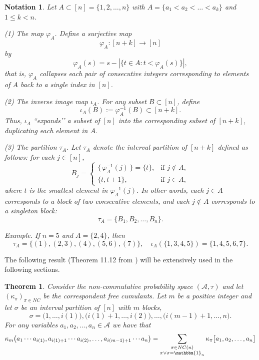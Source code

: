 \documentclass{amsart}
\newtheorem{notation}[claim]{Notation}
\newtheorem{thm}[claim]{Theorem}
\begin{document}
 \begin{notation}
 Let $A \subset [n] = \{1, 2, \dots, n\}$ with
 $A = \{a_1 < a_2 < \dots < a_k\}$ and $1 \le k < n$.
 
 \smallskip
 \noindent
 (1) The map $\varphi_A$.
 Define a surjective map
 \[
 \varphi_A : [n+k] \to [n]
 \]
 by
 \[
 \varphi_A(s) = s - |\{t \in A : t < \varphi_A(s)\}|,
 \]
 that is, $\varphi_A$ collapses each pair of consecutive integers
 corresponding to elements of $A$ back to a single index in $[n]$. 
 
 \smallskip
 \noindent
 (2) The inverse image map $\iota_A$.
 For any subset $B \subset [n]$, define
 \[
 \iota_A(B) := \varphi_A^{-1}(B) \subset [n+k].
 \]
 Thus, $\iota_A$ “expands’’ a subset of $[n]$ into the corresponding subset of $[n+k]$, duplicating each element in $A$.
 
 \smallskip
 \noindent
 (3) The partition $\tau_A$.
 Let $\tau_A$ denote the interval partition of $[n+k]$ defined as follows:
 for each $j \in [n]$,
 \[
 B_j =
 \begin{cases}
 	\{\, \varphi_A^{-1}(j) \,\} = \{t\}, & \text{if } j \notin A,\\[3pt]
 	\{t, t+1\}, & \text{if } j \in A,
 \end{cases}
 \]
 where $t$ is the smallest element in $\varphi_A^{-1}(j)$.
 In other words, each $j \in A$ corresponds to a block of two consecutive elements, and each $j \notin A$ corresponds to a singleton block:
 \[
 \tau_A = \{B_1, B_2, \dots, B_n\}.
 \]
 
 \smallskip
 \noindent
 Example.
 If $n=5$ and $A = \{2, 4\}$, then
 \[
 \tau_A = \{(1), (2,3), (4), (5,6), (7)\},
 \quad
 \iota_A(\{1,3,4,5\}) = \{1,4,5,6,7\}.
 \]
 \end{notation}
 
 
The following result (Theorem 11.12 from \cite{nisp}) will be extensively used in the
following sections.
\begin{thm}\label{thm:product-entries}
Consider the non-commutative probability space $(\mathcal{A}, \tau)$ and let
$(\kappa_\pi)_{\pi \in NC} $ be the correspondent free cumulants. Let $m $ be a positive integer and let $\sigma $ be an interval partition of $[n]$ with $m$ blocks, 
\[ \sigma = \big(1, \dots, i(1)\big), \big(i(1)+1, \dots, i(2)\big), 
\dots, 
\big(i(m-1)+1, \dots, n\big).
\]
For any variables $ a_1, a_2, \dots, a_n \in \mathcal{A}$  we have that
\[ 
\kappa_m \big( a_1\cdots a_{i(1)}, a_{i(1)+1} \cdots a_{i(2)}, \dots, a_{i(m-1)+1} \cdots a_n \big)
= 
\sum_{\substack{\pi\in NC(n)\\ \pi \vee \sigma = \mathbbm{1}_n}}
\kappa_{\pi}\big[a_1,a_2, \dots, a_n\big]
\]

\end{thm}
\end{document}
